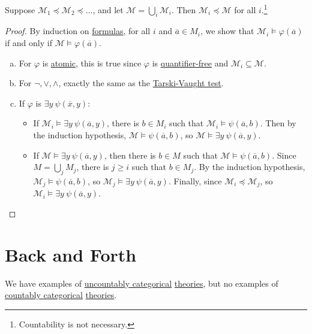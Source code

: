 \begin{proposition}
	Suppose \(\mathcal{M} _1 \preceq \mathcal{M} _2 \preceq \dots \), and let \(\mathcal{M} = \bigcup_{i} \mathcal{M} _i\). Then \(\mathcal{M} _i \preceq \mathcal{M} \) for all \(i\).\footnote{Countability is not necessary.}
\end{proposition}
\begin{proof}
	By induction on \hyperref[def:formula]{formulas}, for all \(i\) and \(\overline{a} \in M_i\), we show that \(\mathcal{M} _i \models \varphi (\overline{a} )\) if and only if \(\mathcal{M} \models \varphi (\overline{a} )\).
	\begin{enumerate}[(a)]
		\item For \(\varphi \) is \hyperref[not:atomic]{atomic}, this is true since \(\varphi \) is \hyperref[not:quantifier-free]{quantifier-free} and \(\mathcal{M} _i \subseteq \mathcal{M} \).
		\item For \(\lnot, \lor, \land \), exactly the same as the \hyperref[prop:Tarski-Vaught-test]{Tarski-Vaught test}.
		\item If \(\varphi \) is \(\exists y\ \psi (\overline{x} , y)\):
		      \begin{itemize}
			      \item If \(\mathcal{M} _i \models \exists y\ \psi (\overline{a} , y)\), there is \(b\in M_i\) such that \(\mathcal{M} _i \models \psi (\overline{a} , b)\). Then by the induction hypothesis, \(\mathcal{M} \models \psi (\overline{a} , b)\), so \(\mathcal{M} \models \exists y\ \psi (\overline{a} , y)\).
			      \item If \(\mathcal{M} \models \exists y\ \psi (\overline{a} , y)\), then there is \(b\in M\) such that \(\mathcal{M} \models \psi (\overline{a} , b)\). Since \(M = \bigcup_{j} M_j\), there is \(j \geq i\) such that \(b\in M_j\). By the induction hypothesis, \(\mathcal{M} _j \models \psi (\overline{a} , b)\), so \(\mathcal{M} _j \models \exists y\ \psi (\overline{a} , y)\). Finally, since \(\mathcal{M} _i \preceq \mathcal{M} _j\), so \(\mathcal{M} _i \models \exists y\ \psi (\overline{a} , y)\).
		      \end{itemize}
	\end{enumerate}
\end{proof}

\section{Back and Forth}
We have examples of \hyperref[def:uncountably-categorical]{uncountably categorical} \hyperref[def:theory]{theories}, but no examples of \hyperref[def:countably-categorical]{countably categorical} \hyperref[def:theory]{theories}.


